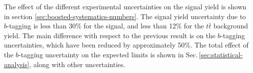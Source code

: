 The effect of the different experimental uncertainties on the signal yield is shown in section \ref{sec:boosted-systematics-numbers}. The signal yield uncertainty due to $b$-tagging is less than 30\% for the signal, and less than 12\% for the $t\bar{t}$ background yield. The main difference with respect to the previous result is on the $b$-tagging uncertainties, which have been reduced by approximately 50\%.
The total effect of the $b$-tagging uncertainty on the expected limits is shown in Sec.\,\ref{sec:statistical-analysis}, along with other uncertainties.

%
%
